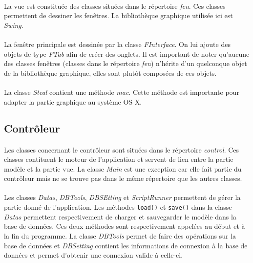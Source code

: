 \documentclass[a4paper,10pt]{report}
\begin{document}
			\paragraph*{}
			La vue est constituée des classes situées dans le répertoire \textit{fen}.
			Ces classes permettent de dessiner les fenêtres. La bibliothèque graphique utilisée ici est \textit{Swing}.

			\paragraph*{}
			  La fenêtre principale est dessinée par la classe \textit{FInterface}.
			  On lui ajoute des objets de type \textit{FTab} afin de créer des onglets. 
			  Il est important de noter qu'aucune des classes fenêtres (classes dans le répertoire \textit{fen}) n’hérite d'un quelconque objet de la bibliothèque graphique, elles sont plutôt composées de ces objets.

			\paragraph*{}
			La classe \textit{Stcal} contient une méthode \textit{mac}. Cette méthode est importante pour adapter la partie graphique au système OS X.

		\subsection{Contrôleur}

			\paragraph*{}
			  Les classes concernant le contrôleur sont situées dans le répertoire \textit{control}.
			  Ces classes contituent le moteur de l'application et servent de lien entre la partie modèle et la partie vue.
			  La classe \textit{Main} est une exception car elle fait partie du contrôleur mais ne se trouve pas dans le même répertoire que les autres classes.

			\paragraph*{}
			Les classes \textit{Datas}, \textit{DBTools}, \textit{DBSEtting} et \textit{ScriptRunner} permettent de gérer la partie donné de l'application. 
			Les méthodes \texttt{load()} et \texttt{save()} dans la classe \textit{Datas} permettent respectivement de charger et sauvegarder le modèle dans la base de données. Ces deux méthodes sont respectivement appelées au début et à la fin du programme.
			La classe \textit{DBTools} permet de faire des opérations sur la base de données et \textit{DBSetting} contient les informations de connexion à la base de données et permet d'obtenir une connexion valide à celle-ci.
\end{document}
